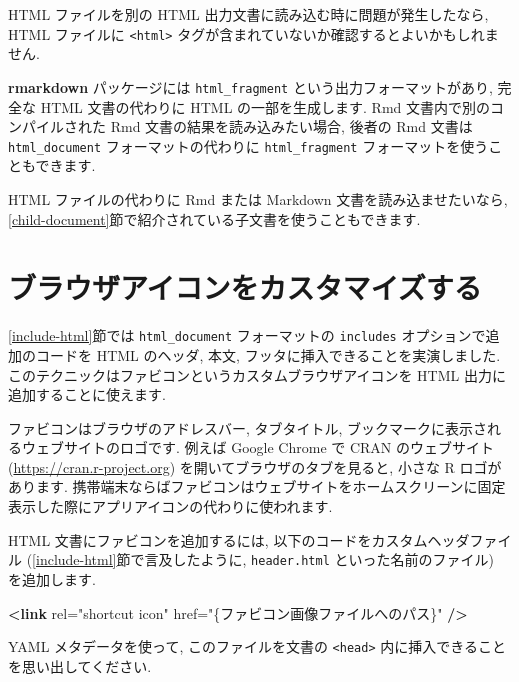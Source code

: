 \documentclass[
  11pt,
]{bxjsreport}
\newenvironment{Shaded}{\begin{snugshade}}{\end{snugshade}}
\newcommand{\KeywordTok}[1]{\textcolor[rgb]{0.13,0.29,0.53}{\textbf{#1}}}
\newcommand{\OtherTok}[1]{\textcolor[rgb]{0.56,0.35,0.01}{#1}}
\newcommand{\StringTok}[1]{\textcolor[rgb]{0.31,0.60,0.02}{#1}}
\begin{document}
HTML ファイルを別の HTML 出力文書に読み込む時に問題が発生したなら, HTML ファイルに \texttt{\textless{}html\textgreater{}} タグが含まれていないか確認するとよいかもしれません.

\textbf{rmarkdown} パッケージには \texttt{html\_fragment} という出力フォーマットがあり, 完全な HTML 文書の代わりに HTML の一部を生成します. Rmd 文書内で別のコンパイルされた Rmd 文書の結果を読み込みたい場合, 後者の Rmd 文書は \texttt{html\_document} フォーマットの代わりに \texttt{html\_fragment} フォーマットを使うこともできます.

HTML ファイルの代わりに Rmd または Markdown 文書を読み込ませたいなら, \ref{child-document}節で紹介されている子文書を使うこともできます.

\hypertarget{favicon}{%
\section{ブラウザアイコンをカスタマイズする}\label{favicon}}

\ref{include-html}節では \texttt{html\_document} フォーマットの \texttt{includes} オプションで追加のコードを HTML のヘッダ, 本文, フッタに挿入できることを実演しました. このテクニックはファビコンというカスタムブラウザアイコンを HTML 出力に追加することに使えます.

ファビコンはブラウザのアドレスバー, タブタイトル, ブックマークに表示されるウェブサイトのロゴです. 例えば Google Chrome で CRAN のウェブサイト (\url{https://cran.r-project.org}) を開いてブラウザのタブを見ると, 小さな R ロゴがあります. 携帯端末ならばファビコンはウェブサイトをホームスクリーンに固定表示した際にアプリアイコンの代わりに使われます.

HTML 文書にファビコンを追加するには, 以下のコードをカスタムヘッダファイル (\ref{include-html}節で言及したように, \texttt{header.html} といった名前のファイル) を追加します.

\begin{Shaded}
\begin{Highlighting}[]
\KeywordTok{\textless{}link}\OtherTok{ rel=}\StringTok{"shortcut icon"}\OtherTok{ href=}\StringTok{"\{ファビコン画像ファイルへのパス\}"} \KeywordTok{/\textgreater{}}
\end{Highlighting}
\end{Shaded}

YAML メタデータを使って, このファイルを文書の \texttt{\textless{}head\textgreater{}} 内に挿入できることを思い出してください.
\end{document}
